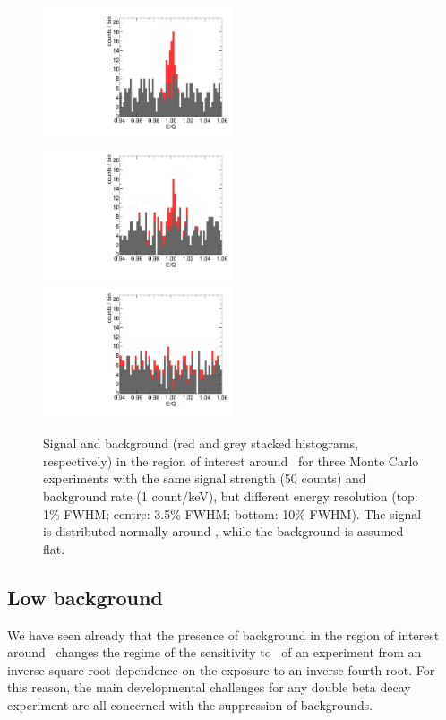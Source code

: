 \documentclass{PoS}
\begin{document}
\begin{figure}
\centering
\includegraphics[width=0.5\textwidth]{img/ROI_SNR_1.pdf}
\includegraphics[width=0.5\textwidth]{img/ROI_SNR_3.pdf}
\includegraphics[width=0.5\textwidth]{img/ROI_SNR_10.pdf}
\caption{Signal and background (red and grey stacked histograms, respectively) in the region of interest around \Qbb\ for three Monte Carlo experiments with the same signal strength (50 counts) and background rate (1 count/keV), but different energy resolution (top: 1\% FWHM; centre: 3.5\% FWHM; bottom: 10\% FWHM). The signal is distributed normally around \Qbb, while the background is assumed flat.} \label{fig:EnergyResolutionSNR}
\end{figure}


\subsection{Low background} \label{subsec:Backgrounds}
We have seen already that the  presence of background in the region of interest around \Qbb\ changes the regime of the sensitivity to \mbb\ of an experiment from an inverse square-root dependence on the exposure to an inverse fourth root. For this reason, the main developmental challenges for any double beta decay experiment are all concerned with the suppression of backgrounds. 
\end{document}

